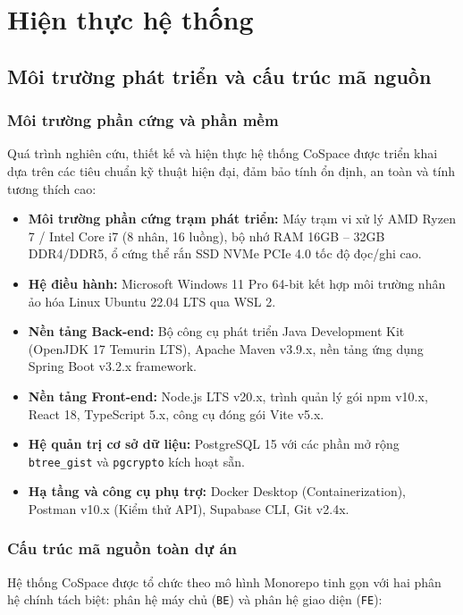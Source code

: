 \section{Hiện thực hệ thống}

\subsection{Môi trường phát triển và cấu trúc mã nguồn}

\subsubsection{Môi trường phần cứng và phần mềm}

Quá trình nghiên cứu, thiết kế và hiện thực hệ thống CoSpace được triển khai dựa trên các tiêu chuẩn kỹ thuật hiện đại, đảm bảo tính ổn định, an toàn và tính tương thích cao:

\begin{itemize}
    \item \textbf{Môi trường phần cứng trạm phát triển:} Máy trạm vi xử lý AMD Ryzen 7 / Intel Core i7 (8 nhân, 16 luồng), bộ nhớ RAM 16GB -- 32GB DDR4/DDR5, ổ cứng thể rắn SSD NVMe PCIe 4.0 tốc độ đọc/ghi cao.
    \item \textbf{Hệ điều hành:} Microsoft Windows 11 Pro 64-bit kết hợp môi trường nhân ảo hóa Linux Ubuntu 22.04 LTS qua WSL 2.
    \item \textbf{Nền tảng Back-end:} Bộ công cụ phát triển Java Development Kit (OpenJDK 17 Temurin LTS), Apache Maven v3.9.x, nền tảng ứng dụng Spring Boot v3.2.x framework.
    \item \textbf{Nền tảng Front-end:} Node.js LTS v20.x, trình quản lý gói npm v10.x, React 18, TypeScript 5.x, công cụ đóng gói Vite v5.x.
    \item \textbf{Hệ quản trị cơ sở dữ liệu:} PostgreSQL 15 với các phần mở rộng \texttt{btree\_gist} và \texttt{pgcrypto} kích hoạt sẵn.
    \item \textbf{Hạ tầng và công cụ phụ trợ:} Docker Desktop (Containerization), Postman v10.x (Kiểm thử API), Supabase CLI, Git v2.4x.
\end{itemize}

\subsubsection{Cấu trúc mã nguồn toàn dự án}

Hệ thống CoSpace được tổ chức theo mô hình Monorepo tinh gọn với hai phân hệ chính tách biệt: phân hệ máy chủ (\texttt{BE}) và phân hệ giao diện (\texttt{FE}):

